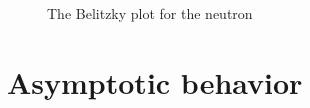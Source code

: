 \begin{figure}
\begin{center}
\caption{The Belitzky plot for the neutron}
\label{fig:nq2f2bel}
\end{center}
\end{figure}


\section{Asymptotic behavior}

